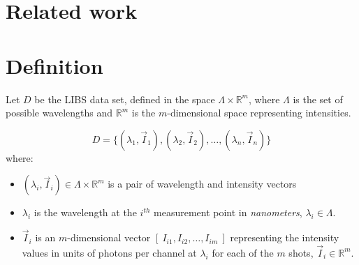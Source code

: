 \section{Related work}



\section{Definition}
Let $D$ be the LIBS data set, defined in the space $\Lambda \times \mathbb{R}^m$, where $\Lambda$ is the set of possible wavelengths and $\mathbb{R}^m$ is the $m$-dimensional space representing intensities.

$$
D = \{ (\lambda_1, \vec{I}_1), (\lambda_2, \vec{I}_2), \ldots, (\lambda_n, \vec{I}_n) \}
$$
where:
\begin{itemize}
    \item $(\lambda_i, \vec{I}_i) \in \Lambda \times \mathbb{R}^{m}$ is a pair of wavelength and intensity vectors
    \item $\lambda_i$ is the wavelength at the $i^{th}$ measurement point in \textit{nanometers}, $\lambda_i \in \Lambda$.
    \item $\vec{I}_i$ is an $m$-dimensional vector $[\ I_{i1}, I_{i2}, \ldots, I_{im}\ ]$ representing the intensity values in units of photons per channel at $\lambda_i$ for each of the $m$ shots, $\vec{I}_i \in \mathbb{R}^m$.
\end{itemize}

